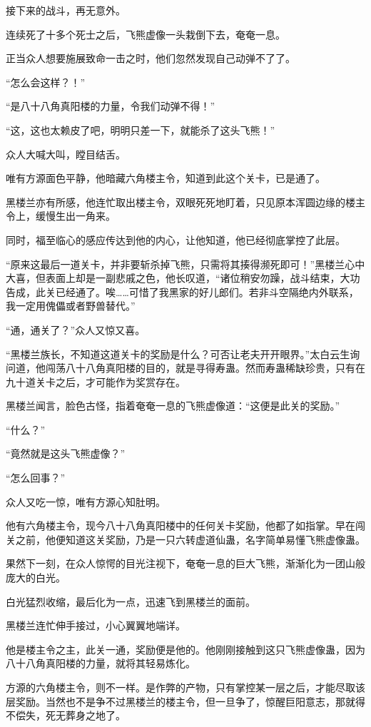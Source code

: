 \begin{this_body}
接下来的战斗，再无意外。

连续死了十多个死士之后，飞熊虚像一头栽倒下去，奄奄一息。

正当众人想要施展致命一击之时，他们忽然发现自己动弹不了了。

“怎么会这样？！”

“是八十八角真阳楼的力量，令我们动弹不得！”

“这，这也太赖皮了吧，明明只差一下，就能杀了这头飞熊！”

众人大喊大叫，瞠目结舌。

唯有方源面色平静，他暗藏六角楼主令，知道到此这个关卡，已是通了。

黑楼兰亦有所感，他连忙取出楼主令，双眼死死地盯着，只见原本浑圆边缘的楼主令上，缓慢生出一角来。

同时，福至临心的感应传达到他的内心，让他知道，他已经彻底掌控了此层。

“原来这最后一道关卡，并非要斩杀掉飞熊，只需将其揍得濒死即可！”黑楼兰心中大喜，但表面上却是一副悲戚之色，他长叹道，“诸位稍安勿躁，战斗结束，大功告成，此关已经通了。唉……可惜了我黑家的好儿郎们。若非斗空隔绝内外联系，我一定用傀儡或者野兽替代。”

“通，通关了？”众人又惊又喜。

“黑楼兰族长，不知道这道关卡的奖励是什么？可否让老夫开开眼界。”太白云生询问道，他闯荡八十八角真阳楼的目的，就是寻得寿蛊。然而寿蛊稀缺珍贵，只有在九十道关卡之后，才可能作为奖赏存在。

黑楼兰闻言，脸色古怪，指着奄奄一息的飞熊虚像道：“这便是此关的奖励。”

“什么？”

“竟然就是这头飞熊虚像？”

“怎么回事？”

众人又吃一惊，唯有方源心知肚明。

他有六角楼主令，现今八十八角真阳楼中的任何关卡奖励，他都了如指掌。早在闯关之前，他便知道这关奖励，乃是一只六转虚道仙蛊，名字简单易懂飞熊虚像蛊。

果然下一刻，在众人惊愕的目光注视下，奄奄一息的巨大飞熊，渐渐化为一团山般庞大的白光。

白光猛烈收缩，最后化为一点，迅速飞到黑楼兰的面前。

黑楼兰连忙伸手接过，小心翼翼地端详。

他是楼主令之主，此关一通，奖励便是他的。他刚刚接触到这只飞熊虚像蛊，因为八十八角真阳楼的力量，就将其轻易炼化。

方源的六角楼主令，则不一样。是作弊的产物，只有掌控某一层之后，才能尽取该层奖励。当然也不是争不过黑楼兰的楼主令，但一旦争了，惊醒巨阳意志，那就得不偿失，死无葬身之地了。


\end{this_body}
